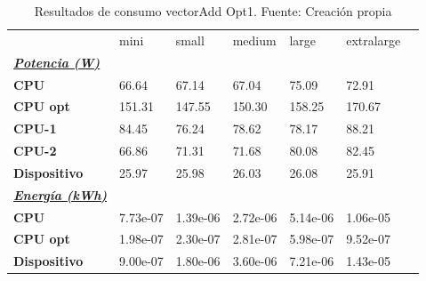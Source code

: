 \begin{table}[H]
    \centering
    \begin{tabular}{lllllll}
    \rowcolor[HTML]{DAE8FC} \ & mini & small & medium & 	large & 	extralarge \\
    \cellcolor[HTML]{DAE8FC} \textbf{\textbf{{\emph{{\underline{{Potencia (W)}}}}}}} &  &  &  & 	 & 	 \\
    \rowcolor[HTML]{EFEFEF} \cellcolor[HTML]{DAE8FC} \textbf{CPU} & 66.64 & 67.14 & 67.04 & 	75.09 & 	72.91 \\
    \cellcolor[HTML]{DAE8FC} \textbf{CPU opt} & 151.31 & 147.55 & 150.30 & 	158.25 & 	170.67 \\
    \rowcolor[HTML]{EFEFEF} \cellcolor[HTML]{DAE8FC} \textbf{\quad CPU-1} & 84.45 & 76.24 & 78.62 & 	78.17 & 	88.21 \\
    \cellcolor[HTML]{DAE8FC} \textbf{\quad CPU-2} & 66.86 & 71.31 & 71.68 & 	80.08 & 	82.45 \\
    \rowcolor[HTML]{EFEFEF} \cellcolor[HTML]{DAE8FC} \textbf{Dispositivo} & 25.97 & 25.98 & 26.03 & 	26.08 & 	25.91 \\
    \cellcolor[HTML]{DAE8FC} \textbf{\textbf{{\emph{{\underline{{Energía (kWh)}}}}}}} &  &  &  & 	 & 	 \\
    \rowcolor[HTML]{EFEFEF} \cellcolor[HTML]{DAE8FC} \textbf{CPU} & 7.73e-07 & 1.39e-06 & 2.72e-06 & 	5.14e-06 & 	1.06e-05 \\
    \cellcolor[HTML]{DAE8FC} \textbf{CPU opt} & 1.98e-07 & 2.30e-07 & 2.81e-07 & 	5.98e-07 & 	9.52e-07 \\
    \rowcolor[HTML]{EFEFEF} \cellcolor[HTML]{DAE8FC} \textbf{Dispositivo} & 9.00e-07 & 1.80e-06 & 3.60e-06 & 	7.21e-06 & 	1.43e-05 \\
    \end{tabular}
    \caption[Resultados de consumo vectorAdd Opt1]{{Resultados de consumo vectorAdd Opt1. Fuente: Creación propia}}
    \label{table_test_vectorAdd_Opt1_hw_powerResults}
\end{table}